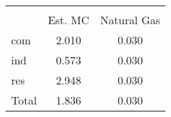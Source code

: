 {
\def\sym#1{\ifmmode^{#1}\else\(^{#1}\)\fi}
\begin{tabular}{l*{1}{cc}}
\hline\hline
                    &\multicolumn{2}{c}{}     \\
                    &     Est. MC& Natural Gas\\
\hline
com                 &       2.010&       0.030\\
ind                 &       0.573&       0.030\\
res                 &       2.948&       0.030\\
Total               &       1.836&       0.030\\
\hline\hline
\end{tabular}
}
